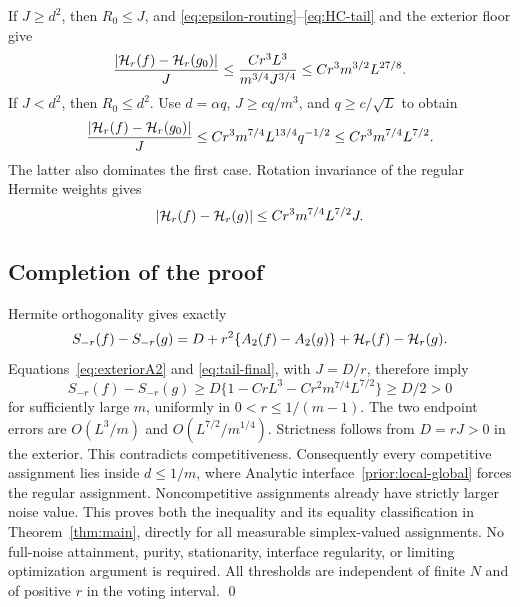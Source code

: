 If $J\ge d^2$, then $R_0\le J$, and
\eqref{eq:epsilon-routing}--\eqref{eq:HC-tail} and the exterior floor give
\[
 \frac{\lvert \mathcal H_r(f)-\mathcal H_r(g_0)\rvert}J
 \le\frac{Cr^3L^3}{m^{3/4}J^{3/4}}
 \le Cr^3m^{3/2}L^{27/8}.
\]
If $J<d^2$, then $R_0\le d^2$. Use $d=\alpha q$, $J\ge cq/m^3$,
and $q\ge c/\sqrt L$ to obtain
\[
 \frac{\lvert \mathcal H_r(f)-\mathcal H_r(g_0)\rvert}J
 \le Cr^3m^{7/4}L^{13/4}q^{-1/2}
 \le Cr^3m^{7/4}L^{7/2}.
\]
The latter also dominates the first case. Rotation invariance of the
regular Hermite weights gives
\begin{equation}\label{eq:tail-final}
 \lvert \mathcal H_r(f)-\mathcal H_r(g)\rvert
                       \le Cr^3m^{7/4}L^{7/2}J.
\end{equation}

\subsection{Completion of the proof}
Hermite orthogonality gives exactly
\[
 S_{-r}(f)-S_{-r}(g)
       =D+r^2\{A_2(f)-A_2(g)\}+\mathcal H_r(f)-\mathcal H_r(g).
\]
Equations~\eqref{eq:exteriorA2} and \eqref{eq:tail-final}, with $J=D/r$,
therefore imply
\begin{equation}\label{eq:strict-exterior}
 S_{-r}(f)-S_{-r}(g)
   \ge D\{1-CrL^3-Cr^2m^{7/4}L^{7/2}\}\ge D/2>0
\end{equation}
for sufficiently large $m$, uniformly in $0<r\le1/(m-1)$.
The two endpoint errors are $O(L^3/m)$ and
$O(L^{7/2}/m^{1/4})$. Strictness follows from $D=rJ>0$ in the exterior.
This contradicts competitiveness. Consequently every competitive assignment
lies inside $d\le1/m$, where Analytic interface~\ref{prior:local-global} forces
the regular assignment. Noncompetitive assignments already have strictly
larger noise value. This proves both the inequality and its equality
classification in Theorem~\ref{thm:main}, directly for all measurable
simplex-valued assignments. No full-noise attainment, purity, stationarity, interface
regularity, or limiting optimization argument is required. All thresholds
are independent of finite $N$ and of positive $r$ in the voting interval.
\qed

